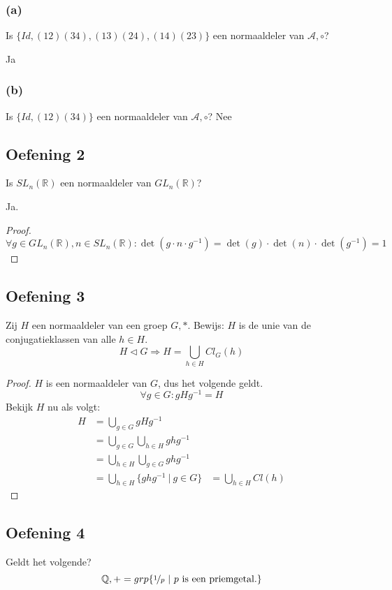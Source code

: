 \documentclass[main.tex]{subfiles}
\begin{document}
\subsubsection*{(a)}
Is $\{ Id, (12)(34),(13)(24),(14)(23) \}$ een normaaldeler van $\mathcal{A},\circ$?
 
Ja
\waarom
\subsubsection*{(b)}
Is $\{ Id, (12)(34) \}$ een normaaldeler van $\mathcal{A},\circ$?
Nee
\waarom

\subsection*{Oefening 2}
\label{sec:oz4-oef2}
Is $SL_{n}(\mathbb{R})$ een normaaldeler van $GL_{n}(\mathbb{R})$?

Ja.
\begin{proof}
  \[ \forall g\in GL_{n}(\mathbb{R}), n\in SL_{n}(\mathbb{R}): \det(g\cdot n \cdot g^{-1}) = \det(g) \cdot \det(n) \cdot \det(g^{-1}) = 1 \]
\end{proof}

\subsection*{Oefening 3}
\label{sec:oz4-oef3}
Zij $H$ een normaaldeler van een groep $G,*$.
Bewijs: $H$ is de unie van de conjugatieklassen van alle $h\in H$.
\[ H \triangleleft G \Rightarrow H = \bigcup_{h\in H}Cl_{G}(h) \]
\begin{proof}
  $H$ is een normaaldeler van $G$, dus het volgende geldt. 
  \[ \forall g\in G: gHg^{-1} = H \]
  Bekijk $H$ nu als volgt:
  \[
  \begin{array}{rll}
    H &= \bigcup_{g\in G} gHg^{-1} &\\
      &= \bigcup_{g\in G} \bigcup_{h\in H} ghg^{-1} &\\
      &= \bigcup_{h\in H} \bigcup_{g\in G} ghg^{-1} &\\
      &= \bigcup_{h\in H} \{ ghg^{-1} \ |\ g\in G \} &= \bigcup_{h\in H}Cl(h)
  \end{array}
  \]
\end{proof}

\subsection{Oefening 4}
\label{sec:oz4-oef4}
Geldt het volgende?
\[ \mathbb{Q},+=grp\{\nicefrac{1}{p} \ |\ p \text{ is een priemgetal.} \} \] 
\end{document}
